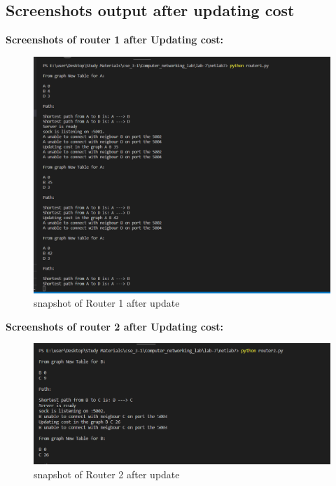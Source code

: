 \documentclass[11pt]{article}
\begin{document}
\subsection{Screenshots output after updating cost }
\textbf{Screenshots of router 1 after Updating cost: }\\[12pt]
 \begin{figure}[!h]
\centering
\includegraphics[width=\textwidth]{r1u.png}
\caption{snapshot of Router 1 after update}
\end{figure}
\FloatBarrier

\textbf{Screenshots of router 2 after Updating cost: }\\[12pt]
 \begin{figure}[!h]
\centering
\includegraphics[width=\textwidth]{r2u.png}
\caption{snapshot of Router 2 after update}
\end{figure}
\FloatBarrier
\end{document}
